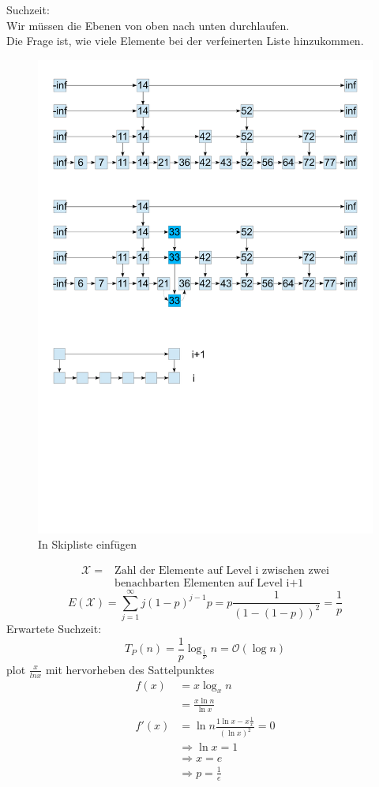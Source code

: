 \documentclass[a4paper,twoside,10pt]{report}
\begin{document}
Suchzeit:\\
Wir müssen die Ebenen von oben nach unten durchlaufen.\\
Die Frage ist, wie viele Elemente bei der verfeinerten Liste hinzukommen.\\
\begin{figure}[H]\center
\includegraphics[trim= .9cm 9cm 8.9cm 18cm,clip,width=\columnwidth]{figures/skiplist.pdf}
\caption{In Skipliste einfügen}
\end{figure}
\begin{align*}\mathcal X = &\mbox{Zahl der Elemente auf Level i zwischen zwei}\\&\mbox{benachbarten Elementen auf Level i+1}\end{align*}
\[E(\mathcal X)=\sum_{j=1}^\infty j(1-p)^{j-1}p=p\frac{1}{(1-(1-p))^2}=\frac{1}{p}\]
Erwartete Suchzeit:
\[T_P(n)=\frac{1}{p}\log_\frac{1}{P}n=\mathcal O (\log n)\]
plot $\frac{x}{ln x}$ mit hervorheben des Sattelpunktes
\begin{align*}
f(x)&=x\log_xn\\
&=\frac{x\ln n}{\ln x}\\
f'(x)&=\ln n \frac{1\ln x -x\frac{1}{x}}{(\ln x)^2}=0\\
&\Rightarrow \ln x = 1\\
&\Rightarrow x=e \\
&\Rightarrow p=\frac{1}{e}
\end{align*}
\end{document}
